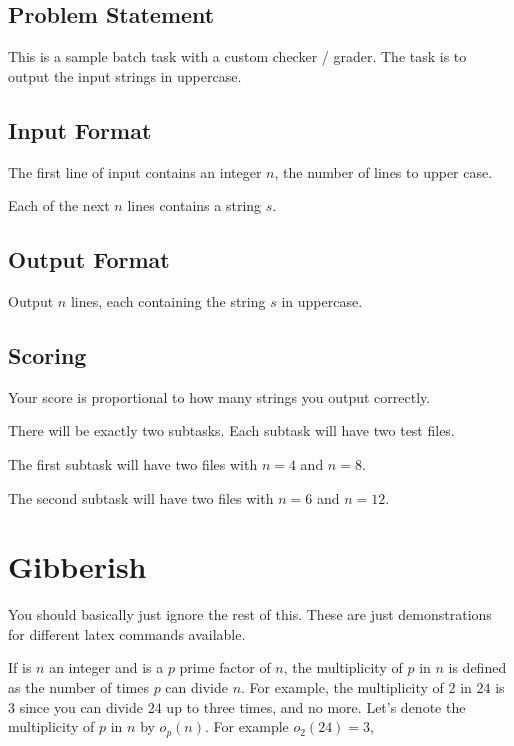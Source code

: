 \subsection*{Problem Statement}

This is a sample batch task with a custom checker / grader. The task is to output the input strings in uppercase.

\subsection*{Input Format}

The first line of input contains an integer \(n\), the number of lines to upper case.

Each of the next \(n\) lines contains a string \(s\).

\subsection*{Output Format}

Output \(n\) lines, each containing the string \(s\) in uppercase.

\subsection*{Scoring}

Your score is proportional to how many strings you output correctly.

There will be exactly two subtasks. Each subtask will have two test files.

The first subtask will have two files with \(n = 4\) and \(n = 8\).

The second subtask will have two files with \(n = 6\) and \(n = 12\).

\section*{Gibberish}

You should basically just ignore the rest of this. These are just demonstrations for different latex commands available.

If is \(n\) an integer and is a \(p\) prime factor of \(n\), the multiplicity of \(p\) in \(n\) is defined as the number of times \(p\) can divide \(n\). For example, the multiplicity of $2$ in $24$ is $3$ since you can divide $24$ up to three times, and no more. Let's denote the multiplicity of $p$ in $n$ by $o_p(n)$. For example \(o_2(24) = 3\), 

